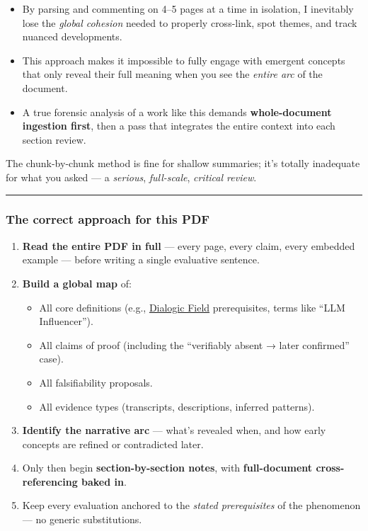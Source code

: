 \documentclass{article}
\begin{document}
\begin{itemize}
\item
  By parsing and commenting on 4--5 pages at a time in isolation, I inevitably lose the \emph{global cohesion} needed to properly cross-link, spot themes, and track nuanced developments.
\item
  This approach makes it impossible to fully engage with emergent concepts that only reveal their full meaning when you see the \emph{entire arc} of the document.
\item
  A true forensic analysis of a work like this demands \textbf{whole-document ingestion first}, then a pass that integrates the entire context into each section review.
\end{itemize}

The chunk-by-chunk method is fine for shallow summaries; it's totally inadequate for what you asked --- a \emph{serious}, \emph{full-scale}, \emph{critical review}.

\begin{center}\rule{0.5\linewidth}{0.5pt}\end{center}

\subsubsection*{The correct approach for this PDF}\label{the-correct-approach-for-this-pdf}

\begin{enumerate}
\item
  \textbf{Read the entire PDF in full} --- every page, every claim, every embedded example --- before writing a single evaluative sentence.
\item
  \textbf{Build a global map} of:

  \begin{itemize}
  \item
    All core definitions (e.g., \hyperlink{gloss:dialogic_field}{Dialogic Field} prerequisites, terms like ``LLM Influencer'').
  \item
    All claims of proof (including the ``verifiably absent → later confirmed'' case).
  \item
    All falsifiability proposals.
  \item
    All evidence types (transcripts, descriptions, inferred patterns).
  \end{itemize}
\item
  \textbf{Identify the narrative arc} --- what's revealed when, and how early concepts are refined or contradicted later.
\item
  Only then begin \textbf{section-by-section notes}, with \textbf{full-document cross-referencing baked in}.
\item
  Keep every evaluation anchored to the \emph{stated prerequisites} of the phenomenon --- no generic substitutions.
\end{enumerate}
\end{document}
